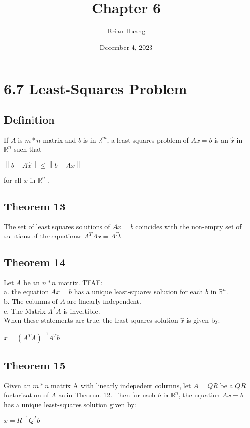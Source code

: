 \documentclass{article}
\title{Chapter 6}
\author{Brian Huang}
\date{December 4, 2023}
\begin{document}
   \maketitle

   \newpage
   \section*{6.7 Least-Squares Problem}
    
   \subsection*{Definition}
   If $A$ is $m*n$ matrix and  $b$ is in $\mathbb{R}^m$, a least-squares problem of $Ax=b$ is an $\hat{x}$ in $\mathbb{R}^n$ such that
   \begin{center}
       $\left \| b - A\hat{x} \right \| \leq \left \| b - Ax  \right \|$
   \end{center}
   for all $x$ in $\mathbb{R}^n$ .\\

  \subsection*{Theorem 13}
  The set of least squares solutions of $Ax = b$ coincides with the non-empty set of solutions of the equations:  $A^TAx=A^Tb$ \\

  \subsection*{Theorem 14}
  Let $A$ be an $n*n$ matrix. TFAE:\\
  a. the equation $Ax=b$ has a unique least-squares solution for each $b$ in $\mathbb{R}^n$.\\
  b. The columns of  $A$ are linearly independent.\\
  c. The Matrix $A^TA$ is invertible.\\
  
When these statements are true, the least-squares solution $\hat{x}$ is given by:\\
  
  \begin{center}
      
   $\hat{x} = (A^TA)^{-1}A^Tb$
\end{center} 


\subsection*{Theorem 15}
Given an $m*n$ matrix A with linearly indepedent columns, let $A = QR$ be a  $QR$ factorization of $A$ as in Theorem 12. Then for each $b$ in $\mathbb{R}^n$, the equation $Ax = b $ has a unique least-squares solution given by:
\begin{center}
    $\hat{x} = R^{-1} Q^Tb$
\end{center}
\end{document}
